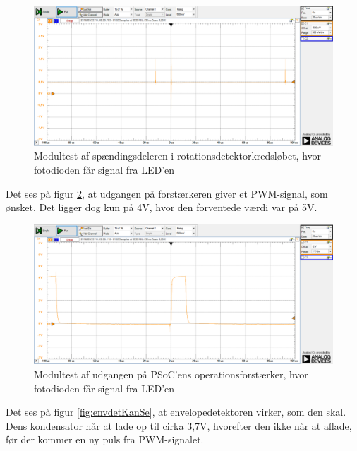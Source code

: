 \begin{figure}[H]
	\centering
	\includegraphics[width=\textwidth]{Test/images/AffyringTest/KanSe/spaendingsdeler}
	\caption{Modultest af spændingsdeleren i rotationsdetektorkredsløbet, hvor fotodioden får signal fra LED'en}
	\label{fig:spaendingsdelerKanSe}
\end{figure}

\noindent Det ses på figur \ref{fig:udgangOpAmpKanSe}, at udgangen på forstærkeren giver et PWM-signal, som ønsket. Det ligger dog kun på 4V, hvor den forventede værdi var på 5V. 

\begin{figure}[H]
	\centering
	\includegraphics[width=\textwidth]{Test/images/AffyringTest/KanSe/udgang_opamp_psoc}
	\caption{Modultest af udgangen på PSoC'ens operationsforstærker, hvor fotodioden får signal fra LED'en}
	\label{fig:udgangOpAmpKanSe}
\end{figure}

\noindent Det ses på figur \ref{fig:envdetKanSe}, at envelopedetektoren virker, som den skal. Dens kondensator når at lade op til cirka 3,7V, hvorefter den ikke når at aflade, før der kommer en ny puls fra PWM-signalet. 

